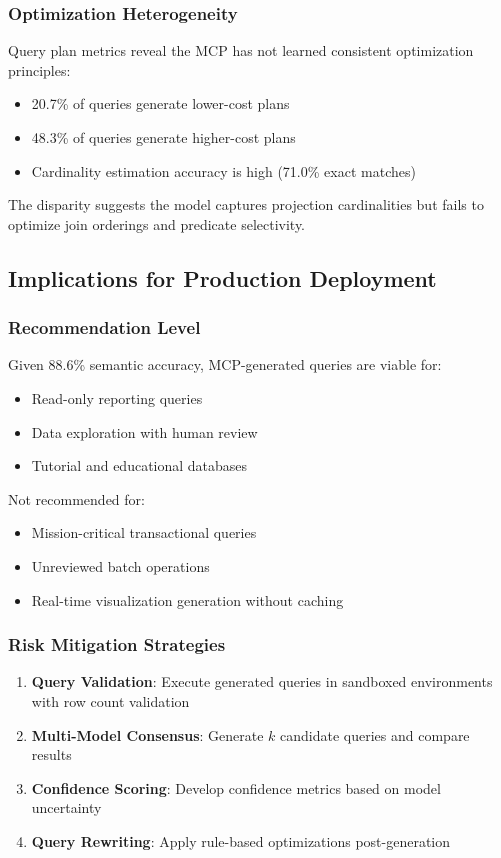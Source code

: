 \documentclass[11pt,a4paper]{article}
\begin{document}
\subsubsection{Optimization Heterogeneity}
Query plan metrics reveal the MCP has not learned consistent optimization principles:
\begin{itemize}
    \item 20.7\% of queries generate lower-cost plans
    \item 48.3\% of queries generate higher-cost plans
    \item Cardinality estimation accuracy is high (71.0\% exact matches)
\end{itemize}

The disparity suggests the model captures projection cardinalities but fails to optimize join orderings and predicate selectivity.

\subsection{Implications for Production Deployment}

\subsubsection{Recommendation Level}
Given 88.6\% semantic accuracy, MCP-generated queries are viable for:
\begin{itemize}
    \item Read-only reporting queries
    \item Data exploration with human review
    \item Tutorial and educational databases
\end{itemize}

Not recommended for:
\begin{itemize}
    \item Mission-critical transactional queries
    \item Unreviewed batch operations
    \item Real-time visualization generation without caching
\end{itemize}

\subsubsection{Risk Mitigation Strategies}
\begin{enumerate}
    \item \textbf{Query Validation}: Execute generated queries in sandboxed environments with row count validation
    \item \textbf{Multi-Model Consensus}: Generate $k$ candidate queries and compare results
    \item \textbf{Confidence Scoring}: Develop confidence metrics based on model uncertainty
    \item \textbf{Query Rewriting}: Apply rule-based optimizations post-generation
\end{enumerate}
\end{document}
